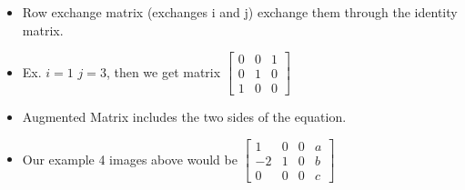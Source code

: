 \begin{itemize}
    \item Row exchange matrix (exchanges i and j) exchange them through the identity matrix. 
    \item Ex. $i=1$ $j=3$, then we get matrix $\begin{bmatrix}0&0&1\\0&1&0\\1&0&0\end{bmatrix}$
    \item Augmented Matrix includes the two sides of the equation.
    \item Our example 4 images above would be $\begin{bmatrix}1&0&0&a\\-2&1&0&b\\0&0&0&c\end{bmatrix}$
    
\end{itemize}
